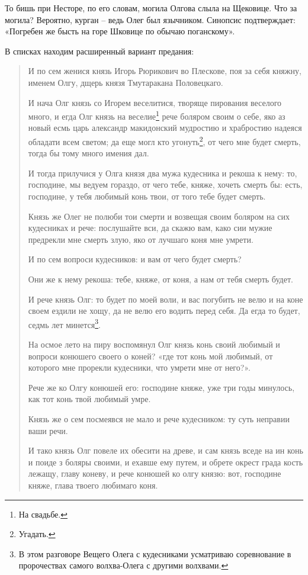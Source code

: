 То бишь при Несторе, по его словам, могила Олгова слыла на Щековице. Что за могила? Вероятно, курган – ведь Олег был язычником. Синопсис подтверждает: «Погребен же бысть на горе Шковице по обычаю поганскому».

В списках находим расширенный вариант предания:

\begin{quotation}
И по сем женися князь Игорь Рюрикович во Плескове, поя за себя княжну, именем Олгу, дщерь князя Тмутаракана Половецкаго.

И нача Олг князь со Игорем веселитися, творяще пирования веселого много, и егда Олг князь на веселие\footnote{На свадьбе.} рече боляром своим о себе, яко аз новый есмь царь александр макидонский мудростию и храбростию надеяся обладати всем светом; да еще могл кто угонуть\footnote{Угадать.}, от чего мне будет смерть, тогда бы тому много имения дал.

И тогда прилучися у Олга князя два мужа кудесника и рекоша к нему: то, господине, мы ведуем гораздо, от чего тебе, княже, хочеть смерть бы: есть, господине, у тебя любимый конь твои, от того тебе будет смерть.

Князь же Олег не полюби тои смерти и возвещая своим боляром на сих кудесниках и рече: послушайте вси, да скажю вам, како сии мужие предрекли мне смерть злую, яко от лучшаго коня мне умрети. 

И по сем вопроси кудесников: и вам от чего будет смерть?

Они же к нему рекоша: тебе, княже, от коня, а нам от тебя смерть будет.

И рече князь Олг: то будет по моей воли, и вас погубить не велю и на коне своем ездили не хощу, да не велю его водить перед себя. Да егда то будет, седмь лет минется\footnote{В этом разговоре Вещего Олега с кудесниками усматриваю соревнование в пророчествах самого волхва-Олега с другими волхвами.}.

На осмое лето на пиру воспомянул Олг князь конь своий любимый и вопроси конюшего своего о коней? «где тот конь мой любимый, от которого мне прорекли кудесники, что умрети мне от него?».

Рече же ко Олгу конюшей его: господине княже, уже три годы минулось, как тот конь твой любимый умре.

Князь же о сем посмеявся не мало и рече кудесником: ту суть неправии ваши речи.

И тако князь Олг повеле их обесити на древе, и сам князь вседе на ин конь и поиде з боляры своими, и ехавше ему путем, и обрете окрест града кость лежащу, главу коневу, и рече конюшей ко олгу князю: вот, господине княже, глава твоего любимаго коня.


\end{quotation}

